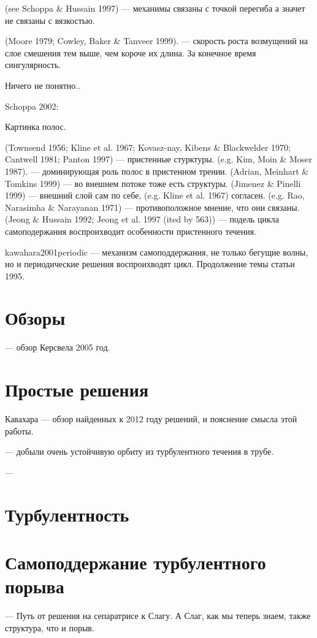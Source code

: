 (see Schoppa \& Hussain 1997) --- механимы связаны с точкой перегиба а значет не связаны с вязкостью. 

(Moore 1979; Cowley, Baker \& Tanveer 1999). --- скорость роста возмущений на слое смешения тем выше, чем короче их длина. За конечное время сингулярность. 

Ничего не понятно.. 

Schoppa 2002: 

Картинка полос. 

(Townsend 1956; Kline et al. 1967; Kovasz-nay, Kibens \& Blackwelder 1970; Cantwell 1981; Panton 1997) --- пристенные стурктуры. (e.g. Kim, Moin \& Moser 1987). --- доминирующая роль полос в пристенном трении. (Adrian, Meinhart \& Tomkins 1999) --- во внешнем потоке тоже есть структуры. (Jimenez \& Pinelli 1999) --- внешний слой сам по себе, (e.g. Kline et al. 1967) согласен. (e.g. Rao, Narasimha \& Narayanan 1971) --- противоположное мнение, что они связаны. (Jeong \& Hussain 1992; Jeong et al. 1997 (ited by 563)) --- подель цикла самоподержания воспроихводит особенности пристенного течения. 

kawahara2001periodic --- механизм самоподдержания, не только бегущие волны, но и периодические решения воспроихводят цикл. Продолжение темы статьи 1995. 

\section{Обзоры}

\cite{kerswell2005recent} --- обзор Керсвела 2005 год. 

\section{Простые решения}

Кавахара \cite{kawahara2012significance} --- обзор найденных к 2012 году решений, и пояснение смысла этой работы. 

\cite{altmeyer2015role} --- добыли очень устойчивую орбиту из турбулентного течения в трубе. 

\cite{budanur2015periodic} --- 

\section{Турбулентность}


\section{Самоподдержание турбулентного порыва}
\cite{duguet2010slug} --- Путь от решения на сепаратрисе к Слагу. А Слаг, как мы теперь знаем, также структура, что и порыв. 



